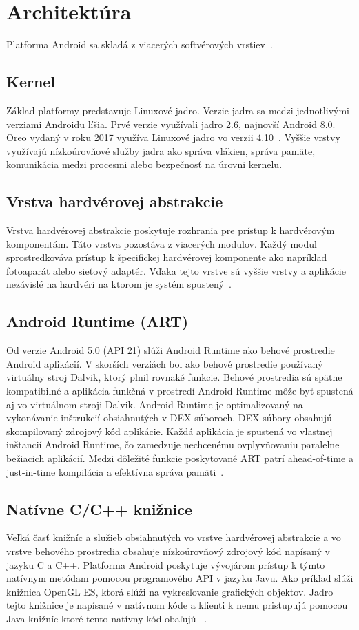 \section{Architektúra}
Platforma Android sa skladá z viacerých softvérových vrstiev~\cite{PlatformArchitecture}.
 
\subsection{Kernel}
Základ platformy predstavuje Linuxové jadro. Verzie jadra sa medzi jednotlivými verziami Androidu líšia. Prvé verzie využívali jadro 2.6, najnovší Android 8.0. Oreo vydaný v roku 2017 využíva Linuxové jadro vo verzii 4.10~\cite{KernelVersions}. Vyššie vrstvy využívajú nízkoúrovňové služby jadra ako správa vlákien, správa pamäte, komunikácia medzi procesmi alebo bezpečnosť na úrovni kernelu. 
\subsection{Vrstva hardvérovej abstrakcie}
Vrstva hardvérovej abstrakcie poskytuje rozhrania pre prístup k hardvérovým komponentám. Táto vrstva pozostáva z viacerých modulov. Každý modul sprostredkováva prístup k špecifickej hardvérovej komponente ako napríklad fotoaparát alebo sieťový adaptér. Vďaka tejto vrstve sú vyššie vrstvy a aplikácie nezávislé na hardvéri na ktorom je systém spustený~\cite{Cohen2014}.
\subsection{Android Runtime (ART)}
Od verzie Android 5.0 (API 21) slúži Android Runtime ako behové prostredie Android aplikácií. V skorších verziách bol ako behové prostredie používaný virtuálny stroj Dalvik, ktorý plnil rovnaké funkcie. Behové prostredia sú spätne kompatibilné a aplikácia funkčná v prostredí Android Runtime môže byť spustená aj vo virtuálnom stroji Dalvik.  Android Runtime je optimalizovaný na vykonávanie inštrukcií obsiahnutých v DEX súboroch. DEX súbory obsahujú skompilovaný zdrojový kód aplikácie. Každá aplikácia je spustená vo vlastnej inštancií Android Runtime, čo zamedzuje nechcenému ovplyvňovaniu paralelne bežiacich aplikácií. Medzi dôležité funkcie poskytované ART patrí ahead-of-time a just-in-time kompilácia a efektívna správa pamäti~\cite{ART}.
\subsection{Natívne C/C++ knižnice}
Veľká časť knižníc a služieb obsiahnutých vo vrstve hardvérovej abstrakcie a vo vrstve behového prostredia obsahuje nízkoúrovňový zdrojový kód napísaný v jazyku C a C++. Platforma Android poskytuje vývojárom prístup k týmto natívnym metódam pomocou programového API v jazyku Javu. Ako príklad slúži knižnica OpenGL ES, ktorá slúži na vykresľovanie grafických objektov. Jadro tejto knižnice je napísané v natívnom kóde a klienti k nemu pristupujú pomocou Java knižníc ktoré tento natívny kód obaľujú ~\cite{Cohen2014}.
